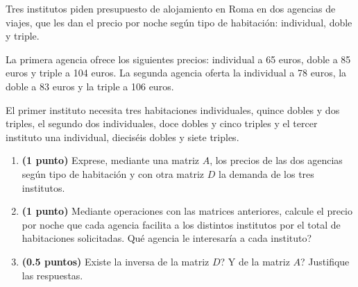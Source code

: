 
Tres institutos piden presupuesto de alojamiento en Roma en dos agencias de
viajes, que les dan el precio por noche según tipo de habitación: individual,
doble y triple.

La primera agencia ofrece los siguientes precios: individual a 65 euros,
doble a 85 euros y triple a 104 euros. La segunda agencia oferta la individual
a 78 euros, la doble a 83 euros y la triple a 106 euros.

El primer instituto necesita tres habitaciones individuales, quince dobles y
dos triples, el segundo dos individuales, doce dobles y cinco triples y el
tercer instituto una individual, dieciséis dobles y siete triples.
\begin{enumerate}[label=\alph*)]
  \item \textbf{(1 punto)} Exprese, mediante una matriz $A$, los precios de
  las dos agencias según tipo de habitación y con otra matriz $D$ la demanda
  de los tres institutos.
  \item \textbf{(1 punto)} Mediante operaciones con las matrices anteriores,
  calcule el precio por noche que cada agencia facilita a los distintos
  institutos por el total de habitaciones solicitadas. \textquestiondown{}Qué
  agencia le interesaría a cada instituto?
  \item \textbf{(0.5 puntos)} \textquestiondown{}Existe la inversa de la matriz
  $D$? \textquestiondown{}Y de la matriz $A$? Justifique las respuestas.
\end{enumerate}
